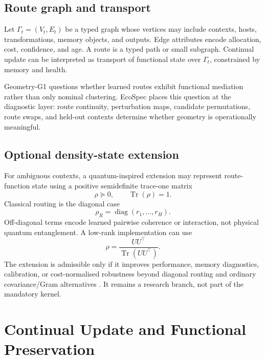 \documentclass[10pt]{article}
\newcommand{\Tr}{\operatorname{Tr}}
\newcommand{\diag}{\operatorname{diag}}
\begin{document}
\subsection{Route graph and transport}

Let $\Gamma_t=(V_t,E_t)$ be a typed graph whose vertices may include contexts, hosts, transformations, memory objects, and outputs. Edge attributes encode allocation, cost, confidence, and age. A route is a typed path or small subgraph. Continual update can be interpreted as transport of functional state over $\Gamma_t$, constrained by memory and health.

Geometry-G1 questions whether learned routes exhibit functional mediation rather than only nominal clustering. EcoSpec places this question at the diagnostic layer: route continuity, perturbation maps, candidate permutations, route swaps, and held-out contexts determine whether geometry is operationally meaningful.

\subsection{Optional density-state extension}

For ambiguous contexts, a quantum-inspired extension may represent route-function state using a positive semidefinite trace-one matrix
\begin{equation}
  \rho\succeq 0,\qquad \Tr(\rho)=1.
  \label{eq:density}
\end{equation}
Classical routing is the diagonal case
\begin{equation}
  \rho_R=\diag(r_1,\ldots,r_H).
\end{equation}
Off-diagonal terms encode learned pairwise coherence or interaction, not physical quantum entanglement. A low-rank implementation can use
\begin{equation}
  \rho=\frac{UU^\top}{\Tr(UU^\top)}.
\end{equation}
The extension is admissible only if it improves performance, memory diagnostics, calibration, or cost-normalised robustness beyond diagonal routing and ordinary covariance/Gram alternatives \citep{stoudenmire2016supervised,schuld2019quantum,mmalsqi}. It remains a research branch, not part of the mandatory kernel.

\section{Continual Update and Functional Preservation}
\end{document}
